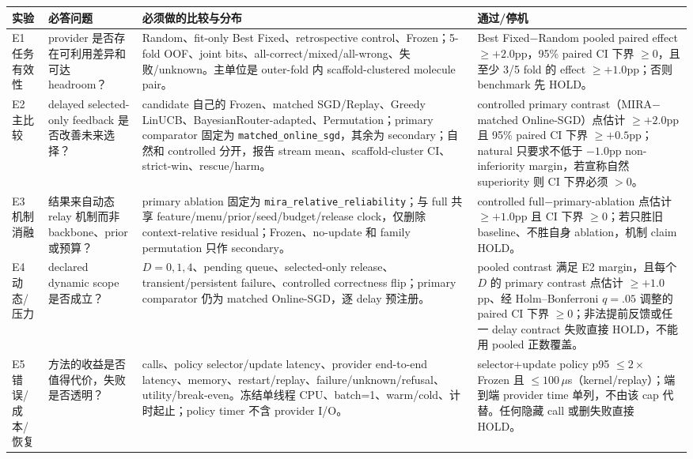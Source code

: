 \documentclass[10pt,letterpaper]{article}
\newcommand{\sect}[1]{\vspace{4pt}{\large\bfseries\color{GuideBlue}#1}\par\vspace{2pt}}
\newenvironment{clean}{\begin{center}\fontsize{8.55}{10.05}\selectfont\setlength{\tabcolsep}{3.7pt}\renewcommand{\arraystretch}{1.04}}{\end{center}}
\begin{document}
\sect{7. E1--E6 目标矩阵：做完它才有资格关门}
\begin{clean}\fontsize{7.35}{8.25}\selectfont\setlength{\tabcolsep}{2.8pt}\renewcommand{\arraystretch}{0.96}
\begin{tabular}{@{}p{.09\linewidth}p{.25\linewidth}p{.40\linewidth}p{.15\linewidth}@{}}
\toprule
实验 & 必答问题 & 必须做的比较与分布 & 通过/停机\\
\midrule
E1 任务有效性 & provider 是否存在可利用差异和可达 headroom？ & Random、fit-only Best Fixed、retrospective control、Frozen；5-fold OOF、joint bits、all-correct/mixed/all-wrong、失败/unknown。主单位是 outer-fold 内 scaffold-clustered molecule pair。 & Best Fixed$-$Random pooled paired effect $\ge+2.0$pp，95\% paired CI 下界 $\ge0$，且至少 3/5 fold 的 effect $\ge+1.0$pp；否则 benchmark 先 HOLD。\\
E2 主比较 & delayed selected-only feedback 是否改善未来选择？ & candidate 自己的 Frozen、matched SGD/Replay、Greedy LinUCB、BayesianRouter-adapted、Permutation；primary comparator 固定为 \texttt{matched\_online\_sgd}，其余为 secondary；自然和 controlled 分开，报告 stream mean、scaffold-cluster CI、strict-win、rescue/harm。 & controlled primary contrast（MIRA$-$matched Online-SGD）点估计 $\ge+2.0$pp 且 95\% paired CI 下界 $\ge+0.5$pp；natural 只要求不低于 $-1.0$pp non-inferiority margin，若宣称自然 superiority 则 CI 下界必须 $>0$。\\
E3 机制消融 & 结果来自动态 relay 机制而非 backbone、prior 或预算？ & primary ablation 固定为 \texttt{mira\_relative\_reliability}；与 full 共享 feature/menu/prior/seed/budget/release clock，仅删除 context-relative residual；Frozen、no-update 和 family permutation 只作 secondary。 & controlled full$-$primary-ablation 点估计 $\ge+1.0$pp 且 CI 下界 $\ge0$；若只胜旧 baseline、不胜自身 ablation，机制 claim HOLD。\\
E4 动态/压力 & declared dynamic scope 是否成立？ & $D=0,1,4$、pending queue、selected-only release、transient/persistent failure、controlled correctness flip；primary comparator 仍为 matched Online-SGD，逐 delay 预注册。 & pooled contrast 满足 E2 margin，且每个 $D$ 的 primary contrast 点估计 $\ge+1.0$pp、经 Holm--Bonferroni $q=.05$ 调整的 paired CI 下界 $\ge0$；非法提前反馈或任一 delay contract 失败直接 HOLD，不能用 pooled 正数覆盖。\\
E5 错误/成本/恢复 & 方法的收益是否值得代价，失败是否透明？ & calls、policy selector/update latency、provider end-to-end latency、memory、restart/replay、failure/unknown/refusal、utility/break-even。冻结单线程 CPU、batch=1、warm/cold、计时起止；policy timer 不含 provider I/O。 & selector+update policy p95 $\le2\times$ Frozen 且 $\le100\,\mu$s（kernel/replay）；端到端 provider time 单列，不由该 cap 代替。任何隐藏 call 或删失败直接 HOLD。\\

\end{tabular}
\end{clean}
\end{document}
